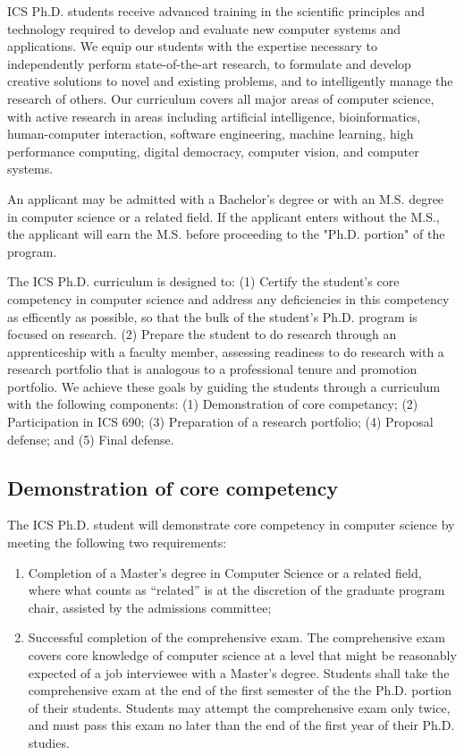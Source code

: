 \documentclass[12pt]{article}
\begin{document}
ICS Ph.D. students receive advanced training in the scientific principles and
technology required to develop and evaluate new computer systems and
applications. We equip our students with the expertise necessary to
independently perform state-of-the-art research, to formulate and develop
creative solutions to novel and existing problems, and to intelligently
manage the research of others. Our curriculum covers all major areas of
computer science, with active research in areas including artificial
intelligence, bioinformatics, human-computer interaction, software
engineering, machine learning, high performance computing, digital
democracy, computer vision, and computer systems.

An applicant may be admitted with a Bachelor's degree or with an
M.S. degree in computer science or a related field. If the applicant enters
without the M.S., the applicant will earn the M.S. before proceeding to the
"Ph.D. portion" of the program.

The ICS Ph.D. curriculum is designed to: (1) Certify the student's core
competency in computer science and address any deficiencies in this
competency as efficently as possible, so that the bulk of the student's
Ph.D. program is focused on research. (2) Prepare the student to do
research through an apprenticeship with a faculty member, assessing
readiness to do research with a research portfolio that is analogous to a
professional tenure and promotion portfolio.  We achieve these goals by
guiding the students through a curriculum with the following components:
(1) Demonstration of core competancy; (2) Participation in ICS 690; (3)
Preparation of a research portfolio; (4) Proposal defense; and (5) Final
defense.

\subsection{Demonstration of core competency}

The ICS Ph.D. student will demonstrate core competency in computer science
by meeting the following two requirements:

\begin{enumerate}
\item Completion of a Master's degree in Computer Science or a related
  field, where what counts as ``related'' is at the discretion of the
  graduate program chair, assisted by the admissions committee;
\item Successful completion of the comprehensive exam.  The comprehensive exam
  covers core knowledge of computer science at a level that might be
  reasonably expected of a job interviewee with a Master's degree.
  Students shall take the comprehensive exam at the end of the first semester
  of the the Ph.D. portion of their students.  Students may attempt the
  comprehensive exam only twice, and must pass this exam no later than the end
  of the first year of their Ph.D. studies.  
\end{enumerate}
\end{document}
